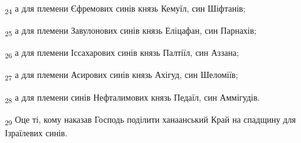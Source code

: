 \begin{tcolorbox}
\textsubscript{24} а для племени Єфремових синів князь Кемуїл, син Шіфтанів;
\end{tcolorbox}
\begin{tcolorbox}
\textsubscript{25} а для племени Завулонових синів князь Еліцафан, син Парнахів;
\end{tcolorbox}
\begin{tcolorbox}
\textsubscript{26} а для племени Іссахарових синів князь Палтіїл, син Аззана;
\end{tcolorbox}
\begin{tcolorbox}
\textsubscript{27} а для племени Асирових синів князь Ахігуд, син Шеломіїв;
\end{tcolorbox}
\begin{tcolorbox}
\textsubscript{28} а для племени синів Нефталимових князь Педаїл, син Аммігудів.
\end{tcolorbox}
\begin{tcolorbox}
\textsubscript{29} Оце ті, кому наказав Господь поділити ханаанський Край на спадщину для Ізраїлевих синів.
\end{tcolorbox}
